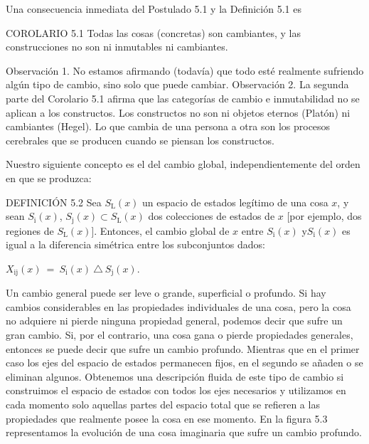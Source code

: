 \begin{justifying}
    Una consecuencia inmediata del Postulado 5.1 y la Definición 5.1 es

    \bigskip

    \noindent COROLARIO 5.1 Todas las cosas (concretas) son cambiantes, y las construcciones
    no son ni inmutables ni cambiantes.

    Observación 1. No estamos afirmando (todavía) que todo esté realmente
    sufriendo algún tipo de cambio, sino solo que puede cambiar. Observación
    2. La segunda parte del Corolario 5.1 afirma que las categorías de cambio
    e inmutabilidad no se aplican a los constructos. Los constructos no son ni
    objetos eternos (Platón) ni cambiantes (Hegel). Lo que cambia
    de una persona a otra son los procesos cerebrales que se producen cuando se piensan los constructos.

    Nuestro siguiente concepto es el del cambio global, independientemente del orden en que se produzca:

    \bigskip

    \noindent DEFINICIÓN 5.2 Sea $S_\mathrm{L}(x)$ un espacio de estados legítimo de una cosa $x$, y sean $S_\mathrm{i}(x)$, 
    $S_\mathrm{j}(x) \subset S_\mathrm{L}(x)$ dos colecciones de estados de $x$ [por ejemplo, dos regiones de
    $S_\mathrm{L}(x)$]. Entonces, el cambio global de $x$ entre $S_\mathrm{i}(x)$ y$S_\mathrm{i}(x)$ es igual a la
    diferencia simétrica entre los subconjuntos dados:

	\medskip

	$X_\mathrm{ij}(x) \:= \:S_\mathrm{i}(x) \:\triangle \: S_\mathrm{j}(x)$.

	\medskip

	Un cambio general puede ser leve o grande, superficial o profundo. Si
	hay cambios considerables en las propiedades individuales de una cosa, pero la
	cosa no adquiere ni pierde ninguna propiedad general, podemos decir que
	sufre un gran cambio. Si, por el contrario, una cosa gana o pierde
	propiedades generales, entonces se puede decir que sufre un cambio profundo.
	Mientras que en el primer caso los ejes del espacio de estados permanecen fijos, en el
	segundo se añaden o se eliminan algunos. Obtenemos una descripción fluida de
	este tipo de cambio si construimos el espacio de estados con todos los ejes necesarios
	y utilizamos en cada momento solo aquellas partes del espacio total que
	se refieren a las propiedades que realmente posee la cosa en ese momento. En la
	figura 5.3 representamos la evolución de una cosa imaginaria que sufre un
	cambio profundo.


\end{justifying}